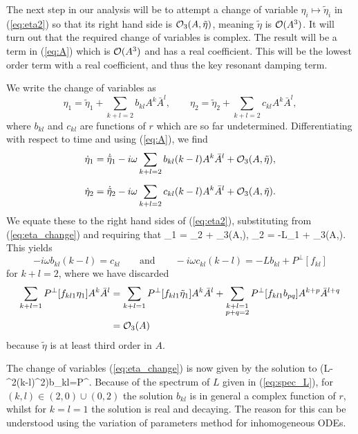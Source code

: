 The next step in our analysis will be to attempt a change of variable $\eta_i\mapsto\tilde{\eta}_i$ in (\ref{eq:eta2}) so that its right hand side is $\mathcal{O}_3(A,\tilde{\eta})$, meaning $\tilde{\eta}$ is $\mathcal{O}(A^3)$. It will turn out that the required change of variables is complex. The result will be a term in (\ref{eq:A}) which is $\mathcal{O}(A^3)$ and has a real coefficient. This will be the lowest order term with a real coefficient, and thus the key resonant damping term. %

We write the change of variables as
\begin{equation} \label{eq:eta_change}
\eta_1 = \tilde{\eta}_1 + \sum_{k+l=2}b_{kl}A^k\bar{A}^l, \qquad \eta_2 = \tilde{\eta}_2 + \sum_{k+l=2}c_{kl}A^k\bar{A}^l,
\end{equation}
where $b_{kl}$ and $c_{kl}$ are functions of $r$ which are so far undetermined. Differentiating with respect to time and using (\ref{eq:A}), we find
\begin{align*}
\dot{\eta}_1 &= \dot{\tilde{\eta}}_1 - i\omega\sum_{k+l=2}b_{kl}(k-l)A^k\bar{A}^l+\mathcal{O}_3(A,\tilde{\eta}), \\[5pt]
 \dot{\eta}_2 &= \dot{\tilde{\eta}}_2 - i\omega\sum_{k+l=2}c_{kl}(k-l)A^k\bar{A}^l + \mathcal{O}_3(A,\tilde{\eta}).
\end{align*}
We equate these to the right hand sides of (\ref{eq:eta2}), substituting from (\ref{eq:eta_change}) and requiring that
\be \label{eq:eta_tilde}
\dot{\tilde{\eta}}_1 = \tilde{\eta}_2 + \cO_3(A,\tilde{\eta}), \qquad \dot{\tilde{\eta}}_2 = -L\tilde{\eta}_1 + \cO_3(A,\tilde{\eta}).
\ee
This yields
\[
-i\omega b_{kl}(k-l)=c_{kl} \qquad\mbox{and}\qquad -i\omega c_{kl}(k-l)=-Lb_{kl} + P^\perp[f_{kl}]
\]
for $k+l=2$, where we have discarded
\begin{align*}
\sum_{k+l=1} P^\perp[f_{kl1}\eta_1]A^k\bar{A}^l &= \sum_{k+l=1} P^\perp [f_{kl1}\tilde{\eta}_1]A^k\bar{A}^l + \sum_{\substack{k+l=1 \\ p+q=2}} P^\perp [f_{kl1}b_{pq}]A^{k+p}\bar{A}^{l+q} \\
&= \mathcal{O}_3(A)
\end{align*}
because $\tilde{\eta}$ is at least third order in $A$.

The change of variables (\ref{eq:eta_change}) is now given by the solution to
\be \label{eq:solve_for_b}
\big(L-\omega^2(k-l)^2\big)b_{kl}=P^\perp[f_{kl}].
\ee
Because of the spectrum of $L$ given in (\ref{eq:spec_L}), for $(k,l)\in(2,0)\cup (0,2)$ the solution $b_{kl}$ is in general a complex function of $r$, whilst for $k=l=1$ the solution is real and decaying. The reason for this can be understood using the variation of parameters method for inhomogeneous ODEs.

